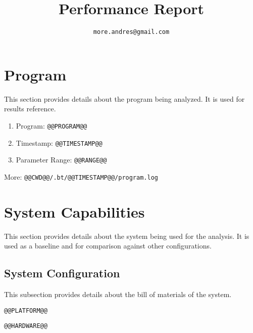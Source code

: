 \documentclass[a4paper]{article}
\begin{document}
\title{Performance Report}

\author{\tt more.andres@gmail.com}

\maketitle


\tableofcontents

\section{Program}

This section provides details about the program being analyzed.
It is used for results reference.

\begin{enumerate}
\item Program: {\tt @@PROGRAM@@}
\item Timestamp: {\tt @@TIMESTAMP@@}
\item Parameter Range: {\tt @@RANGE@@}
\end{enumerate}

More: {\tt @@CWD@@/.bt/@@TIMESTAMP@@/program.log}

\section{System Capabilities}

This section provides details about the system being used for the analysis.
It is used as a baseline and for comparison against other configurations.

\subsection{System Configuration}

This subsection provides details about the bill of materials of the system.

\begin{verbatim}
@@PLATFORM@@
\end{verbatim}

\begin{verbatim}
@@HARDWARE@@
\end{verbatim}
\end{document}
